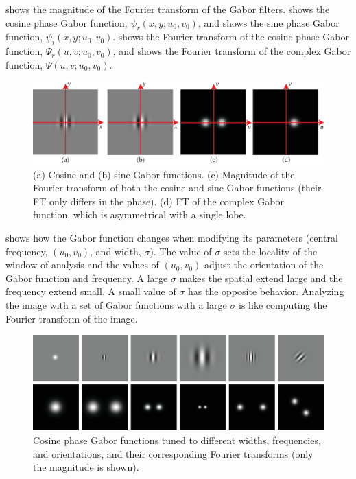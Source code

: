 \Fig{\ref{fig:gabor_ft}} shows the magnitude of the Fourier transform of the Gabor filters.   shows the cosine phase Gabor function, $\psi_r(x,y;u_0,v_0)$, and  shows the sine phase Gabor function, $\psi_i(x,y;u_0,v_0)$.  shows the Fourier transform of the cosine phase Gabor function, $\Psi_r(u,v;u_0,v_0)$, and  shows the Fourier transform of the complex Gabor function, $\Psi(u,v;u_0,v_0)$. 

\begin{figure}
\centerline{
\includegraphics[width=1\linewidth]{figures/spatial_filter_sets/gabor_FT.eps} }
\caption{(a) Cosine and (b) sine Gabor functions. (c) Magnitude of the Fourier transform of both the cosine and sine Gabor functions (their FT only differs in the phase). (d) FT of the complex Gabor function, which is asymmetrical with a single lobe.} 
\label{fig:gabor_ft}
\end{figure}

\Fig{\ref{fig:gabor_ex_ft}} shows how the Gabor function changes when modifying its parameters (central frequency, $(u_0,v_0)$, and width, $\sigma$). 
The value of $\sigma$ sets the locality of the window of analysis and the values of $(u_0,v_0)$ adjust the orientation of the Gabor function and frequency.  A large $\sigma$ makes the spatial extend large and the frequency extend small.  A small value of $\sigma$ has the opposite behavior. 
Analyzing the image with a set of Gabor functions with a large $\sigma$ is like computing the Fourier transform of the image. 


\begin{figure}
\centerline{
\includegraphics[width=1\linewidth]{figures/spatial_filter_sets/gabor_examples_FT.eps} }
\caption{Cosine phase Gabor functions tuned to different widths, frequencies, and orientations, and their corresponding Fourier transforms (only the magnitude is shown).} 
\label{fig:gabor_ex_ft}
\end{figure}


